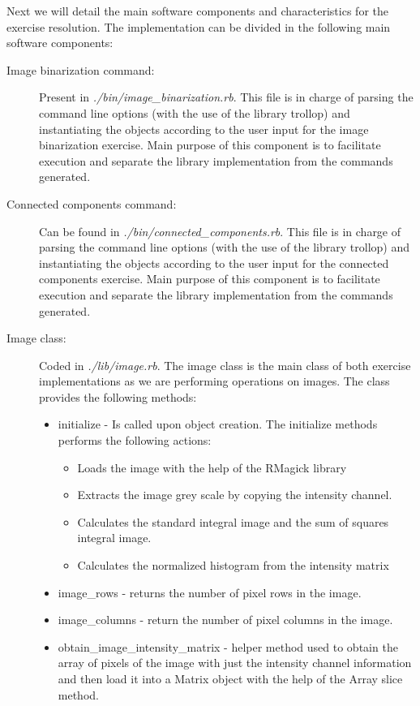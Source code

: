 \documentclass[a4paper,10pt,titlepage]{article}
\begin{document}
\par Next we will detail the main software components and characteristics for the exercise resolution. The implementation can be divided in the following main software components:
\begin{description}
	\item[Image binarization command:] Present in \textit{./bin/image\_binarization.rb}. This file is in charge of parsing the  command line options (with the use of the library trollop) and instantiating the objects according to the user input for the image binarization exercise. Main purpose of this component is to facilitate execution and separate the library implementation from the commands generated. 
	\item[Connected components command:]  Can be found in \textit{./bin/connected\_components.rb}. This file is in charge of parsing the  command line options (with the use of the library trollop) and instantiating the objects according to the user input for the connected components exercise. Main purpose of this component is to facilitate execution and separate the library implementation from the commands generated. 
	\item[Image class:] Coded in \textit{./lib/image.rb}. The image class is the main class of both exercise implementations as we are performing operations on images. The class provides the following methods:
	\begin{itemize}
		\item initialize - Is called upon object creation. The initialize methods performs the following actions:
		\begin{itemize}
			\item Loads the image with the help of the RMagick library
			\item Extracts the image grey scale by copying the intensity channel.
			\item Calculates the standard integral image and the sum of squares integral image.
			\item Calculates the normalized histogram from the intensity matrix
		\end{itemize}
		\item image\_rows - returns the number of pixel rows in the image.
		\item image\_columns - return the number of pixel columns in the image.
		\item obtain\_image\_intensity\_matrix - helper method used to obtain the array of pixels of the image with just the intensity channel information and then load it into a Matrix object with the help of the Array slice method. 

\end{itemize}
\end{description}
\end{document}
